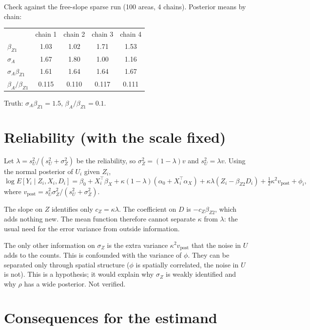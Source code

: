 \documentclass[11pt]{article}
\begin{document}
Check against the free-slope sparse run (100 areas, 4 chains). Posterior means by chain:

\begin{center}
\begin{tabular}{lcccc}
 & chain 1 & chain 2 & chain 3 & chain 4 \\
$\beta_{Z1}$ & 1.03 & 1.02 & 1.71 & 1.53 \\
$\sigma_A$ & 1.67 & 1.80 & 1.00 & 1.16 \\
$\sigma_A \beta_{Z1}$ & 1.61 & 1.64 & 1.64 & 1.67 \\
$\beta_A / \beta_{Z1}$ & 0.115 & 0.110 & 0.117 & 0.111 \\
\end{tabular}
\end{center}

Truth: $\sigma_A\beta_{Z1} = 1.5$, $\beta_A/\beta_{Z1} = 0.1$.

\section{Reliability (with the scale fixed)}

Let $\lambda = s_U^2/(s_U^2 + \sigma_Z^2)$ be the reliability, so $\sigma_Z^2 = (1-\lambda)v$ and $s_U^2 = \lambda v$. Using the normal posterior of $U_i$ given $Z_i$,
\[
\log E[Y_i \mid Z_i, X_i, D_i] = \beta_0 + X_i^\top\beta_X + \kappa(1-\lambda)(\alpha_0 + X_i^\top\alpha_X) + \kappa\lambda (Z_i - \beta_{Z2} D_i) + \tfrac{1}{2}\kappa^2 v_{\text{post}} + \phi_i,
\]
where $v_{\text{post}} = s_U^2\sigma_Z^2/(s_U^2+\sigma_Z^2)$.

The slope on $Z$ identifies only $c_Z = \kappa\lambda$. The coefficient on $D$ is $-c_Z\beta_{Z2}$, which adds nothing new. The mean function therefore cannot separate $\kappa$ from $\lambda$: the usual need for the error variance from outside information.

The only other information on $\sigma_Z$ is the extra variance $\kappa^2 v_{\text{post}}$ that the noise in $U$ adds to the counts. This is confounded with the variance of $\phi$. They can be separated only through spatial structure ($\phi$ is spatially correlated, the noise in $U$ is not). This is a hypothesis; it would explain why $\sigma_Z$ is weakly identified and why $\rho$ has a wide posterior. Not verified.

\section{Consequences for the estimand}
\end{document}
